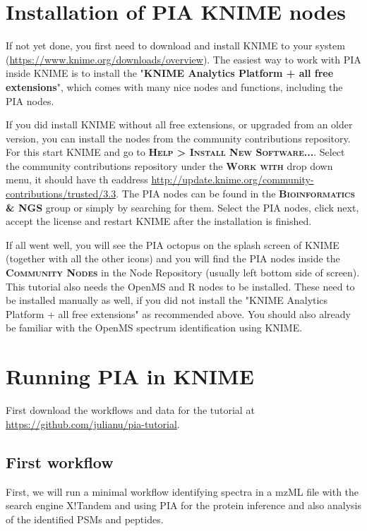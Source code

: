 \documentclass[a4paper,11pt,twoside]{article}
\newcommand{\menu}[1]{{\scshape\bfseries #1}}
\begin{document}
\newpage
\section{Installation of PIA KNIME nodes}

If not yet done, you first need to download and install KNIME to your system
(\url{https://www.knime.org/downloads/overview}). The easiest way to work with
PIA inside KNIME is to install the "\textbf{KNIME Analytics Platform + all free
extensions}", which comes with many nice nodes and functions, including the PIA
nodes.

If you did install KNIME without all free extensions, or upgraded from an older
version, you can install the nodes from the community contributions repository.
For this start KNIME and go to \menu{Help > Install New Software...}. Select the
community contributions repository under the \menu{Work with} drop down menu, it
should have th eaddress
\url{http://update.knime.org/community-contributions/trusted/3.3}. The PIA nodes
can be found in the \menu{Bioinformatics \& NGS} group or simply by searching
for them. Select the PIA nodes, click next, accept the license and restart KNIME
after the installation is finished.

If all went well, you will see the PIA octopus on the splash screen of KNIME
(together with all the other icons) and you will find the PIA nodes inside the
\menu{Community Nodes} in the Node Repository (usually left bottom side of
screen). This tutorial also needs the OpenMS and R nodes to be
installed. These need to be installed manually as well, if you did not install
the "KNIME Analytics Platform + all free extensions" as recommended above. You
should also already be familiar with the OpenMS spectrum identification using
KNIME.


\newpage
\section{Running PIA in KNIME}

First download the workflows and data for the tutorial at
\url{https://github.com/julianu/pia-tutorial}.


\subsection{First workflow}

First, we will run a minimal workflow identifying spectra in a mzML file with
the search engine X!Tandem and using PIA for the protein inference and also
analysis of the identified PSMs and peptides.
\end{document}
